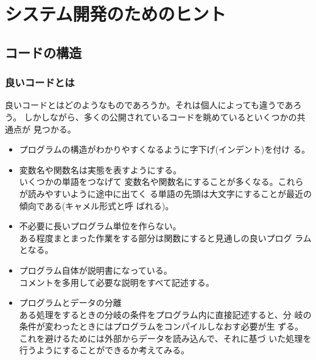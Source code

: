 \chapter{システム開発のためのヒント}
\section{コードの構造}
\subsection{良いコードとは}
良いコードとはどのようなものであろうか。それは個人によっても違うであろう。
しかしながら、多くの公開されているコードを眺めているといくつかの共通点が
見つかる。
\begin{itemize}
 \item プログラムの構造がわかりやすくなるように字下げ(インデント)を付け
			 る。
 \item 変数名や関数名は実態を表すようにする。\\いくつかの単語をつなげて
			 変数名や関数名にすることが多くなる。これらが読みやすいように途中に出てく
			 る単語の先頭は大文字にすることが最近の傾向である(キャメル形式と呼
			 ばれる)。
 \item 不必要に長いプログラム単位を作らない。\\
			 ある程度まとまった作業をする部分は関数にすると見通しの良いプログ
			 ラムとなる。
 \item プログラム自体が説明書になっている。\\
			 コメントを多用して必要な説明をすべて記述する。
 \item プログラムとデータの分離\\
			 ある処理をするときの分岐の条件をプログラム内に直接記述すると、分
			 岐の条件が変わったときにはプログラムをコンパイルしなおす必要が生
			 ずる。これを避けるためには外部からデータを読み込んで、それに基づ
			 いた処理を行うようにすることができるか考えてみる。
\end{itemize}
